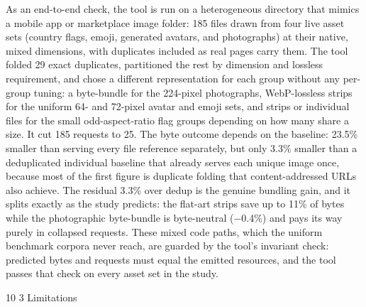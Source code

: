 \documentclass[3p,twocolumn]{elsarticle}
\makeatletter
\renewcommand\subsection{\@startsection{subsection}{2}{\z@}%
           {10\p@ \@plus 3\p@ \@minus 3\p@}%
           {3\p@ \@plus 2\p@ \@minus 1\p@}%
           {\normalfont\normalsize\itshape}}
\makeatother
\begin{document}
As an end-to-end check, the tool is run on a heterogeneous directory
that mimics a mobile app or marketplace image folder: 185 files drawn
from four live asset sets (country flags, emoji, generated avatars, and
photographs) at their native, mixed dimensions, with duplicates included
as real pages carry them. The tool folded 29 exact duplicates,
partitioned the rest by dimension and lossless requirement, and chose a
different representation for each group without any per-group tuning: a
byte-bundle for the 224-pixel photographs, WebP-lossless strips for the
uniform 64- and 72-pixel avatar and emoji sets, and strips or individual
files for the small odd-aspect-ratio flag groups depending on how many
share a size. It cut 185 requests to 25. The byte outcome depends on the
baseline: 23.5\% smaller than serving every file reference separately,
but only 3.3\% smaller than a deduplicated individual baseline that
already serves each unique image once, because most of the first figure
is duplicate folding that content-addressed URLs also achieve. The
residual 3.3\% over dedup is the genuine bundling gain, and it splits
exactly as the study predicts: the flat-art strips save up to 11\% of
bytes while the photographic byte-bundle is byte-neutral (−0.4\%) and
pays its way purely in collapsed requests. These mixed code paths, which
the uniform benchmark corpora never reach, are guarded by the
tool's invariant check: predicted bytes and requests
must equal the emitted resources, and the tool passes that check on
every asset set in the study.

\subsection{Limitations}
\end{document}
